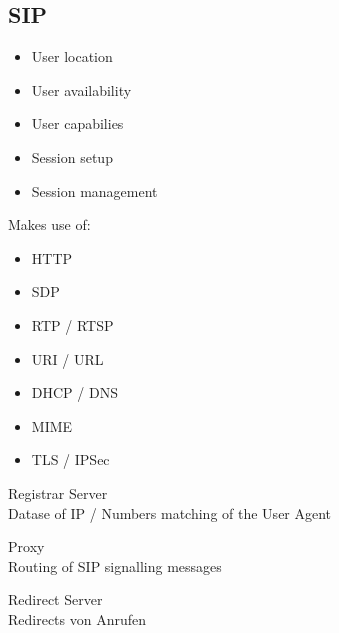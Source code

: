 \subsection{SIP}

\begin{itemize}
	\item User location
	\item User availability
	\item User capabilies
	\item Session setup
	\item Session management
\end{itemize}

Makes use of:
\begin{itemize}
	\item HTTP
	\item SDP
	\item RTP / RTSP
	\item URI / URL
	\item DHCP / DNS
	\item MIME
	\item TLS / IPSec
\end{itemize}

\begin{description}
	\item Registrar Server \hfill \\
		Datase of IP / Numbers matching of the User Agent
	\item Proxy \hfill \\
		Routing of SIP signalling messages
	\item Redirect Server \hfill \\
		Redirects von Anrufen
	
\end{description}

